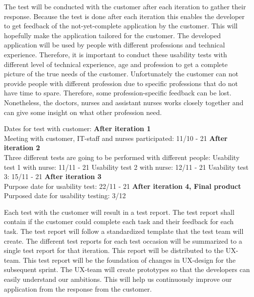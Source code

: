 \noindent The test will be conducted with the customer after each iteration to gather their response. Because the test is done after each iteration this enables the developer to get feedback of the not-yet-complete application by the customer. This will hopefully make the application tailored for the customer. The developed application will be used by people with different professions and technical experience. Therefore, it is important to conduct these usability tests with different level of technical experience, age and profession to get a complete picture of the true needs of the customer. Unfortunately the customer can not provide people with different profession due to specific professions that do not have time to spare. Therefore, some profession-specific feedback can be lost. Nonetheless, the doctors, nurses and assistant nurses works closely together and can give some insight on what other profession need. \newline

\noindent Dates for test with customer:\newline
\textbf{After iteration 1}\\
Meeting with customer, IT-staff and nurses participated: 11/10 - 21\newline
\textbf{After iteration 2}\\
Three different tests are going to be performed with different people:\newline
Usability test 1 with nurse: 11/11 - 21\newline
Usability test 2 with nurse: 12/11 - 21\newline
Usability test 3: 15/11 - 21\newline
\textbf{After iteration 3}\\
Purpose date for usability test: 22/11 - 21\newline
\textbf{After iteration 4, Final product}\\
Purposed date for usability testing: 3/12\newline

\noindent Each test with the customer will result in a test report. The test report shall contain if the customer could complete each task and their feedback for each task. The test report will follow a standardized template that the test team will create. The different test reports for each test occasion will be summarized to a single test report for that iteration. This report will be distributed to the UX-team. This test report will be the foundation of changes in UX-design for the subsequent sprint. The UX-team will create prototypes so that the developers can easily understand our ambitions. This will help us continuously improve our application from the response from the customer.\newline

